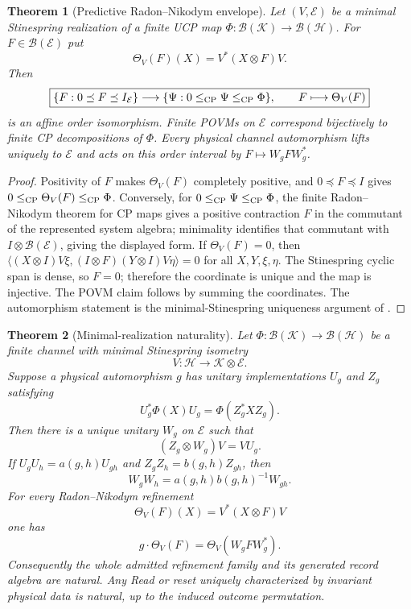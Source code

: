 \documentclass[11pt]{article}
\newtheorem{theorem}{Theorem}[section]
\theoremstyle{definition}
\theoremstyle{remark}
\newcommand{\Hh}{\mathcal H}
\newcommand{\K}{\mathcal K}
\begin{document}
\begin{theorem}[Predictive Radon--Nikodym envelope]
\label{thm:predictive-RN-master}
Let $(V,\mathcal E)$ be a minimal Stinespring realization of a finite UCP map
$\Phi:\mathcal B(\K)\to\mathcal B(\Hh)$.  For $F\in\mathcal B(\mathcal E)$ put
\[
  \Theta_V(F)(X)=V^*(X\otimes F)V.
\]
Then
\[
 \boxed{
 \{F:0\preceq F\preceq I_{\mathcal E}\}
 \longrightarrow
 \{\Psi:0\le_{\rm CP}\Psi\le_{\rm CP}\Phi\},
 \qquad F\longmapsto\Theta_V(F)}
\]
is an affine order isomorphism.  Finite POVMs on $\mathcal E$ correspond
bijectively to finite CP decompositions of $\Phi$.  Every physical channel
automorphism lifts uniquely to $\mathcal E$ and acts on this order interval by
$F\mapsto W_gFW_g^*$.
\end{theorem}

\begin{proof}
Positivity of $F$ makes $\Theta_V(F)$ completely positive, and
$0\preceq F\preceq I$ gives
$0\le_{\rm CP}\Theta_V(F)\le_{\rm CP}\Phi$.  Conversely, for
$0\le_{\rm CP}\Psi\le_{\rm CP}\Phi$, the finite Radon--Nikodym theorem for CP
maps gives a positive contraction $F$ in the commutant of the represented
system algebra; minimality identifies that commutant with
$I\otimes\mathcal B(\mathcal E)$, giving the displayed form.  If
$\Theta_V(F)=0$, then
$\langle (X\otimes I)V\xi,(I\otimes F)(Y\otimes I)V\eta\rangle=0$
for all $X,Y,\xi,\eta$.  The Stinespring cyclic span is dense, so $F=0$;
therefore the coordinate is unique and the map is injective.  The POVM claim
follows by summing the coordinates.  The automorphism statement is the
minimal-Stinespring uniqueness argument of
.
\end{proof}

\begin{theorem}[Minimal-realization naturality]
\label{thm:minimal-realization-naturality-master}
Let $\Phi:\mathcal B(\K)\to\mathcal B(\Hh)$ be a finite channel with minimal
Stinespring isometry
\[
 V:\Hh\longrightarrow\K\otimes\mathcal E.
\]
Suppose a physical automorphism $g$ has unitary implementations $U_g$ and
$Z_g$ satisfying
\[
 U_g^*\Phi(X)U_g=\Phi(Z_g^*XZ_g).
\]
Then there is a unique unitary $W_g$ on $\mathcal E$ such that
\[
 \boxed{(Z_g\otimes W_g)V=VU_g.}
\]
If $U_gU_h=a(g,h)U_{gh}$ and $Z_gZ_h=b(g,h)Z_{gh}$, then
\[
 \boxed{W_gW_h=a(g,h)b(g,h)^{-1}W_{gh}.}
\]
For every Radon--Nikodym refinement
\[
 \Theta_V(F)(X)=V^*(X\otimes F)V
\]
one has
\[
 \boxed{g\cdot\Theta_V(F)=\Theta_V(W_gFW_g^*).}
\]
Consequently the whole admitted refinement family and its generated record
algebra are natural.  Any Read or reset uniquely characterized by invariant
physical data is natural, up to the induced outcome permutation.
\end{theorem}
\end{document}
